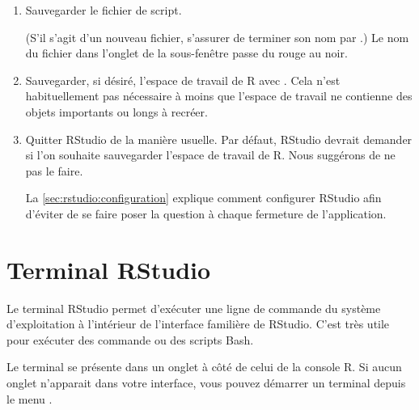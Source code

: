 \begin{enumerate}
\begin{trivlist}
  \end{trivlist}
\item Sauvegarder le fichier de script.
  (S'il s'agit d'un nouveau fichier, s'assurer de terminer son nom par
  .) Le nom du fichier dans l'onglet de la sous-fenêtre passe
  du rouge au noir.
\item Sauvegarder, si désiré, l'espace de travail de R avec
  . Cela n'est
  habituellement pas nécessaire à moins que l'espace de travail ne
  contienne des objets importants ou longs à recréer.
\item Quitter RStudio de la manière usuelle. Par défaut, RStudio
  devrait demander si l'on souhaite sauvegarder l'espace de travail de
  R. Nous suggérons de ne pas le faire.

  La \autoref{sec:rstudio:configuration} explique comment configurer
  RStudio afin d'éviter de se faire poser la question à chaque
  fermeture de l'application.
\end{enumerate}



\section{Terminal RStudio}
\label{sec:rstudio:terminal}

Le terminal RStudio permet d'exécuter une
ligne de commande du système d'exploitation à l'intérieur de
l'interface familière de RStudio. C'est très utile pour exécuter des
commande ou des scripts Bash.

Le terminal se présente dans un onglet à côté de celui de la console
R. Si aucun onglet n'apparait dans votre interface, vous pouvez
démarrer un terminal depuis le menu .

